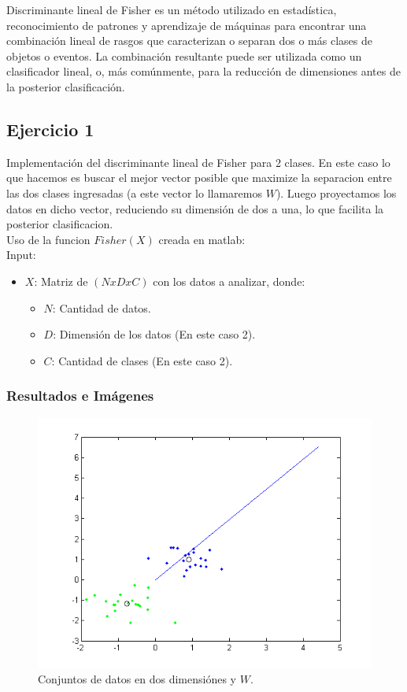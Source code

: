 Discriminante lineal de Fisher es un método utilizado en estadística, reconocimiento de patrones y aprendizaje de máquinas para encontrar una combinación lineal de rasgos que caracterizan o separan dos o más clases de objetos o eventos. La combinación resultante puede ser utilizada como un clasificador lineal, o, más comúnmente, para la reducción de dimensiones antes de la posterior clasificación.

\subsection{Ejercicio 1}

Implementación del discriminante lineal de Fisher para 2 clases. En este caso lo que hacemos es buscar el mejor vector posible que maximize la separacion entre las dos clases ingresadas (a este vector lo llamaremos $W$). Luego proyectamos los datos en dicho vector, reduciendo su dimensión de dos a una, lo que facilita la posterior clasificacion.
\\
Uso de la funcion $Fisher(X)$ creada en matlab:\\
Input:
\begin{itemize}
	\item $X$: Matriz de $(NxDxC)$ con los datos a analizar, donde:\\
	\begin{itemize}
	\item	$N$: Cantidad de datos.\\
	\item	$D$: Dimensión de los datos (En este caso 2).\\     
	\item	$C$: Cantidad de clases (En este caso 2).\\
	\end{itemize}
\end{itemize}

\subsubsection{Resultados e Imágenes}

\begin{figure}[ht!]
\centering
\includegraphics[width=120mm]{img/tp4/ej1-1.png}
\caption{Conjuntos de datos en dos dimensiónes y $W$.}
\end{figure}

